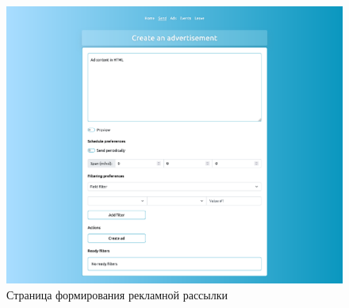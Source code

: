 \begin{appendices}
\begin{figure}[h!]
	\centering
    \includegraphics[width=\linewidth]{./images/ad.png}
    \caption{Страница формирования рекламной рассылки}
    \label{img:ad}
\end{figure}


\newpage

	
\end{appendices}